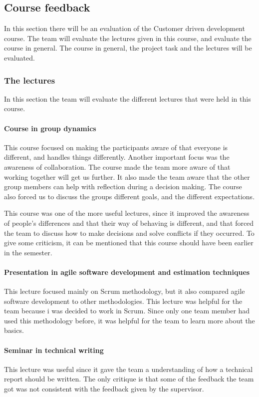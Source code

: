 \subsection{Course feedback}
In this section there will be an evaluation of the Customer driven development course. The team will evaluate the lectures given in this course, and evaluate the course in general.
The course in general, the project task and the lectures will be evaluated.

\subsubsection{The lectures}
In this section the team will evaluate the different lectures that were held in this course.

\paragraph{Course in group dynamics}
This course focused on making the participants aware of that everyone is different, and handles things differently. Another important focus was the awareness of collaboration. The course made the team more aware of that working together will get us further. It also made the team aware that the other group members can help with reflection during a decision making. The course also forced us to discuss the groups different goals, and the different expectations. 

This course was one of the more useful lectures, since it improved the awareness of people's differences
and that their way of behaving is different, and that forced the team to discuss how to make decisions and solve conflicts if they occurred. To give some criticism, it can be mentioned that this course should have been earlier in the semester.

\paragraph{Presentation in agile software development and estimation techniques}
This lecture focused mainly on Scrum methodology, but it also compared agile software development to other methodologies. This lecture was helpful for the team because i was decided to work in Scrum. Since only one team member had used this methodology before, it was helpful for the team to learn more about the basics. 

\paragraph{Seminar in technical writing}
This lecture was useful since it gave the team a understanding of how a technical report should be written. The only critique is that some of the feedback the team got was not consistent with the feedback given by the supervisor.

